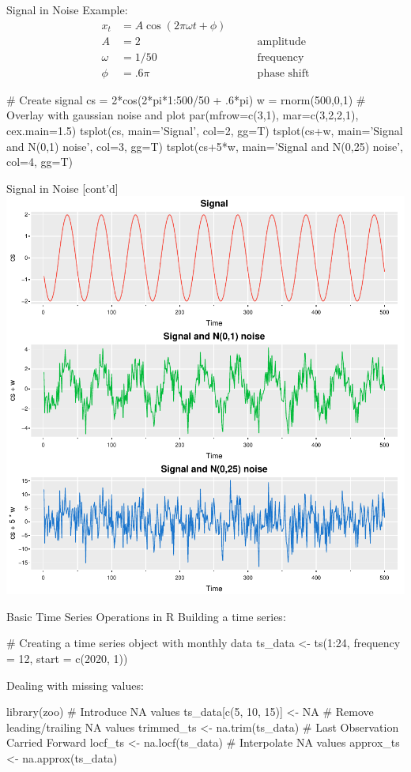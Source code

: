 \documentclass[ignorenonframetext,xcolor=x11names]{beamer}
\begin{document}
\begin{frame}[fragile]{Signal in Noise}
Example:
\begin{align*}
x_t &= A \cos (2 \pi \omega t + \phi) \\
A &= 2 &\qquad \text{amplitude} \\
\omega &= 1/50 &\qquad \text{frequency} \\
\phi &= .6 \pi &\qquad \text{phase shift}
\end{align*}

\vspace{-1.5\baselineskip}
\begin{Rcode}
# Create signal
cs = 2*cos(2*pi*1:500/50 + .6*pi)
w = rnorm(500,0,1)
# Overlay with gaussian noise and plot
par(mfrow=c(3,1), mar=c(3,2,2,1), cex.main=1.5)
tsplot(cs, 
    main='Signal', col=2, gg=T)
tsplot(cs+w, 
    main='Signal and N(0,1) noise', col=3, gg=T)
tsplot(cs+5*w, 
    main='Signal and N(0,25) noise', col=4, gg=T)
\end{Rcode}
\end{frame}

\begin{frame}{Signal in Noise \small [cont'd]}
\centering
\includegraphics[width=.75\textwidth]{figure5.pdf}
\end{frame}

\begin{frame}[fragile]{Basic Time Series Operations in R}
Building a time series:
\begin{Rcode}
# Creating a time series object with monthly data
ts_data <- ts(1:24, frequency = 12, start = c(2020, 1))
\end{Rcode}
Dealing with missing values:
\begin{Rcode}
library(zoo)
# Introduce NA values
ts_data[c(5, 10, 15)] <- NA
# Remove leading/trailing NA values
trimmed_ts <- na.trim(ts_data)
# Last Observation Carried Forward
locf_ts <- na.locf(ts_data)
# Interpolate NA values
approx_ts <- na.approx(ts_data)
\end{Rcode}
\end{frame}
\end{document}
